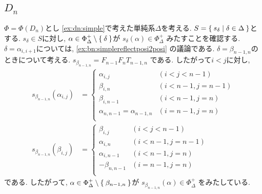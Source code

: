 \subsection{$D_{n}$}
$\Phi=\Phi(D_n)$とし
\cref{ex:dn:simple}で考えた単純系$\Delta$を考える.
$S=\Set{s_\delta|\delta\in \Delta}$とする.
$s_\delta\in S$に対し,
$\alpha\in\Phi_\Delta^+\setminus\Set{\delta}$が
$s_{\delta}(\alpha)\in\Phi_\Delta^+$
みたすことを確認する.
$\delta=\alpha_{i,i+1}$については,
\cref{ex:bn:simplereflectposi2posi}
の議論である.
$\delta=\beta_{n-1,n}$のときについて考える.
$s_{\beta_{n-1,n}}=F_{n-1}F_{n}T_{n-1,n}$
である. したがって$i<j$に対し,
\begin{align*}
  s_{\beta_{n-1,n}}(\alpha_{i,j})
  &=
  \begin{cases}
    \alpha_{i,j}&(i<j<n-1)\\
    \beta_{i,n}&(i<n-1,j=n-1)\\
    \beta_{i,n-1}&(i<n-1,j=n)\\
    \alpha_{n,n-1}=\alpha_{n-1,n}&(i=n-1,j=n)\\
  \end{cases}\\
  s_{\beta_{n-1,n}}(\beta_{i,j})
  &=
  \begin{cases}
    \beta_{i,j}&(i<j<n-1)\\
    \alpha_{i,n}&(i<n-1,j=n-1)\\
    \alpha_{i,n-1}&(i<n-1,j=n)\\
    -\beta_{n,n-1}&(i=n-1,j=n)\\
  \end{cases}
\end{align*}
である.
したがって,
$\alpha\in\Phi_\Delta^+\setminus\Set{\beta_{n-1,n}}$が
$s_{\beta_{n-1,n}}(\alpha)\in\Phi_\Delta^+$
をみたしている.

